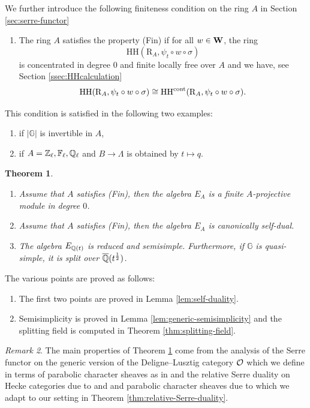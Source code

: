 \documentclass[a4paper, 10pt, oneside, reqno]{amsart}
\theoremstyle{plain}
\newtheorem{thm}{Theorem}[subsection]
\theoremstyle{definition}
\theoremstyle{remark}
\newtheorem{rque}[thm]{Remark}
\newcommand{\Gbb}{\mathbb{G}}
\newcommand{\RR}{\mathrm{R}}
\newcommand{\HHH}{\mathrm{HH}}
\begin{document}
We further introduce the following finiteness condition on the ring $A$ in Section \ref{sec:serre-functor} 
\begin{enumerate}
\item[(Fin)] The ring $A$ satisfies the property (Fin) if for all $w \in \mathbf{W}$, the ring 
$$\HHH(\RR_A, \psi_t \circ w \circ \sigma)$$ 
is concentrated in degree $0$ and finite locally free over $A$ and we have, see Section \ref{ssec:HHcalculation}	
$$\HHH(\RR_A, \psi_t \circ w \circ \sigma) \cong \HHH^{\cont}(\RR_A, \psi_t \circ w \circ \sigma).$$ 
\end{enumerate}
This condition is satisfied in the following two examples:
\begin{enumerate}
\item if $|\Gbb|$ is invertible in $A$, 
\item if $A = \mathbb{Z}_{\ell}, \mathbb{F}_{\ell}, \mathbb{Q}_{\ell}$ and $B \to \Lambda$ is obtained by $t \mapsto q$. 
\end{enumerate}

\begin{thm}\label{thm:intro-generic-representations-finiteness}
\begin{enumerate}
\item Assume that $A$ satisfies (Fin), then the algebra $E_A$ is a finite $A$-projective module in degree $0$. 
\item Assume that $A$ satisfies (Fin), then the algebra $E_A$ is canonically self-dual. 
\item The algebra $E_{\mathbb{Q}(t)}$ is reduced and semisimple. Furthermore, if $\Gbb$ is quasi-simple, it is split over $\overline{\mathbb{Q}}(t^{\frac{1}{2}})$. 
\end{enumerate}
\end{thm}

The various points are proved as follows: 
\begin{enumerate}
\item The first two points are proved in Lemma \ref{lem:self-duality}.
\item Semisimplicity is proved in Lemma \ref{lem:generic-semisimplicity} and the splitting field is computed in Theorem \ref{thm:splitting-field}. 
\end{enumerate}

\begin{rque}
The main properties of Theorem \ref{thm:intro-generic-representations-finiteness} come from the analysis of the Serre functor on the generic version of the Deligne--Lusztig category $\mathcal{O}$ which we define in terms of parabolic character sheaves as in \cite{EteveTilting} and the relative Serre duality on Hecke categories due to \cite{HoLiRelativeSerre} and \cite{SandvikRelativeSerreDuality} and parabolic character sheaves due to \cite{GaitsgoryRozemblyumVarshavsky} which we adapt to our setting in Theorem \ref{thm:relative-Serre-duality}. 
\end{rque} 
\end{document}

